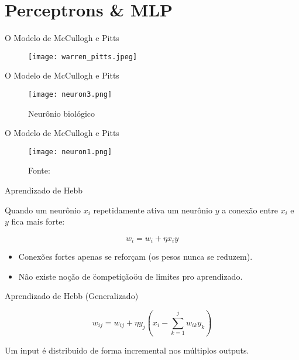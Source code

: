 \section{Perceptrons \& MLP}

\begin{frame}{O Modelo de McCullogh e Pitts}

  \begin{figure}[t]
    \texttt{[image: warren\_pitts.jpeg]}
    \centering
  \end{figure}

\end{frame}

\begin{frame}{O Modelo de McCullogh e Pitts}

  \begin{figure}[t]
    \texttt{[image: neuron3.png]}
    \caption{Neurônio biológico}
    \centering
  \end{figure}

\end{frame}

\begin{frame}{O Modelo de McCullogh e Pitts}

  \begin{figure}[t]
    \texttt{[image: neuron1.png]}
    \caption{Fonte: \cite{mcculloch1943logical}}
    \centering
  \end{figure}

\end{frame}

\begin{frame}{Aprendizado de Hebb}

  Quando um neurônio $x_i$ repetidamente ativa um neurônio $y$ a
  conexão entre $x_i$ e $y$ fica mais forte:

  \[ w_{i} = w_{i} + \eta x_i y \]

  \pause

  \begin{itemize}
    \item Conexões fortes apenas se reforçam (os pesos nunca se reduzem).
    \item Não existe noção de \"competição\" ou de limites pro aprendizado.
  \end{itemize}

\end{frame}

\begin{frame}{Aprendizado de Hebb (Generalizado)}

  \[ w_{ij} = w_{ij} + \eta y_j \left(x_i - \sum_{k=1}^{j} w_{ik}y_{k} \right)\]

  Um input é distribuido de forma incremental nos múltiplos outputs.

\end{frame}

